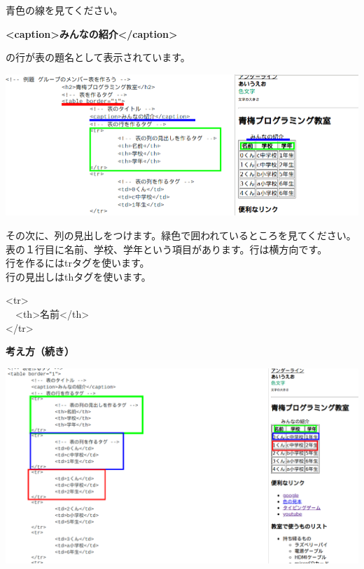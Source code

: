 \documentclass[a4paper,12pt]{jarticle}
\begin{document}
青色の線を見てください。

\textbf{{\textless}caption{\textgreater}みんなの紹介{\textless}/caption{\textgreater}}

の行が表の題名として表示されています。



\bigskip

\includegraphics[width=13.462cm]{textbook-img190.png}


\bigskip

その次に、列の見出しをつけます。緑色で囲われているところを見てください。\\
表の１行目に名前、学校、学年という項目があります。行は横方向です。\\
行を作るにはtrタグを使います。\\
行の見出しはthタグを使います。\\


\bigskip

{\textless}tr{\textgreater}\\
\ \ {\textless}th{\textgreater}名前{\textless}/th{\textgreater}\\
{\textless}/tr{\textgreater}\\

\bigskip

\clearpage
\textbf{考え方（続き）}



\bigskip

\bigskip


\centering
\includegraphics[width=\textwidth]{textbook-img191.png}
\end{document}
